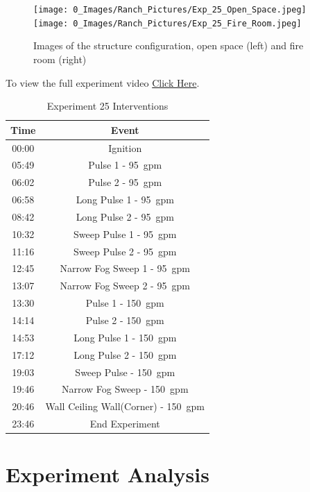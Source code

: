 \documentclass[12pt,oneside]{book}
\begin{document}
\begin{figure}[H]
\centering
\texttt{[image: 0\_Images/Ranch\_Pictures/Exp\_25\_Open\_Space.jpeg]}
\texttt{[image: 0\_Images/Ranch\_Pictures/Exp\_25\_Fire\_Room.jpeg]}
\caption{Images of the structure configuration, open space (left) and fire room (right)}
\label{fig:Exp_25_Images}
\end{figure}

To view the full experiment video \href{https://youtu.be/gl8rc1Nsl1k}{Click Here}.

\begin{table}[H]
	\centering
	\caption{Experiment 25 Interventions}
	\begin{tabular}{|c|c|} 
		\hline
		Time & 	Event \\ \hline \hline
		00:00 &	Ignition \\ \hline
		05:49 &	Pulse 1 - 95~gpm \\ \hline
		06:02 &	Pulse 2 -  95~gpm \\ \hline
		06:58 &	Long Pulse 1 - 95~gpm \\ \hline
		08:42 &	Long Pulse 2 - 95~gpm \\ \hline
		10:32 &	Sweep Pulse 1 - 95~gpm \\ \hline
		11:16 &	Sweep Pulse 2 - 95~gpm \\ \hline
		12:45 &	Narrow Fog Sweep 1 - 95~gpm \\ \hline
		13:07 &	Narrow Fog Sweep 2 - 95~gpm \\ \hline
		13:30 &	Pulse 1 - 150~gpm \\ \hline
		14:14 &	Pulse 2 - 150~gpm \\ \hline
		14:53 &	Long Pulse 1 - 150~gpm \\ \hline
		17:12 &	Long Pulse 2 - 150~gpm \\ \hline
		19:03 &	Sweep Pulse  - 150~gpm \\ \hline
		19:46 &	Narrow Fog Sweep  - 150~gpm \\ \hline
		20:46 &	Wall Ceiling Wall(Corner) - 150~gpm \\ \hline
		23:46 &	End Experiment \\ \hline
	\end{tabular}
	\label{Table:Exp25Interventions}
\end{table}

\chapter{Experiment Analysis}
\end{document}
